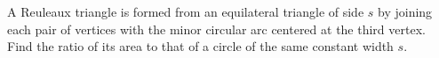 A Reuleaux triangle is formed from an equilateral triangle of side $s$ by joining each pair of vertices with the minor circular arc centered at the third vertex. Find the ratio of its area to that of a circle of the same constant width $s$.
